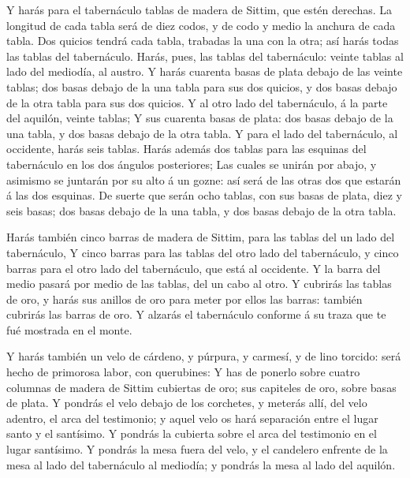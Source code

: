  Y harás para el tabernáculo tablas de madera de Sittim,
que estén derechas.  La longitud de cada tabla será de diez
codos, y de codo y medio la anchura de cada tabla.  Dos
quicios tendrá cada tabla, trabadas la una con la otra; así harás todas
las tablas del tabernáculo.  Harás, pues, las tablas del
tabernáculo: veinte tablas al lado del mediodía, al austro.
 Y harás cuarenta basas de plata debajo de las veinte
tablas; dos basas debajo de la una tabla para sus dos quicios, y dos
basas debajo de la otra tabla para sus dos quicios.  Y al
otro lado del tabernáculo, á la parte del aquilón, veinte tablas;
 Y sus cuarenta basas de plata: dos basas debajo de la una
tabla, y dos basas debajo de la otra tabla.  Y para el lado
del tabernáculo, al occidente, harás seis tablas.  Harás
además dos tablas para las esquinas del tabernáculo en los dos ángulos
posteriores;  Las cuales se unirán por abajo, y asimismo se
juntarán por su alto á un gozne: así será de las otras dos que estarán á
las dos esquinas.  De suerte que serán ocho tablas, con sus
basas de plata, diez y seis basas; dos basas debajo de la una tabla, y
dos basas debajo de la otra tabla.

 Harás también cinco barras de madera de Sittim, para las
tablas del un lado del tabernáculo,  Y cinco barras para
las tablas del otro lado del tabernáculo, y cinco barras para el otro
lado del tabernáculo, que está al occidente.  Y la barra
del medio pasará por medio de las tablas, del un cabo al otro.
 Y cubrirás las tablas de oro, y harás sus anillos de oro
para meter por ellos las barras: también cubrirás las barras de oro.
 Y alzarás el tabernáculo conforme á su traza que te fué
mostrada en el monte.

 Y harás también un velo de cárdeno, y púrpura, y carmesí,
y de lino torcido: será hecho de primorosa labor, con querubines:
 Y has de ponerlo sobre cuatro columnas de madera de Sittim
cubiertas de oro; sus capiteles de oro, sobre basas de plata.
 Y pondrás el velo debajo de los corchetes, y meterás allí,
del velo adentro, el arca del testimonio; y aquel velo os hará
separación entre el lugar santo y el santísimo.  Y pondrás
la cubierta sobre el arca del testimonio en el lugar santísimo.
 Y pondrás la mesa fuera del velo, y el candelero enfrente
de la mesa al lado del tabernáculo al mediodía; y pondrás la mesa al
lado del aquilón.

